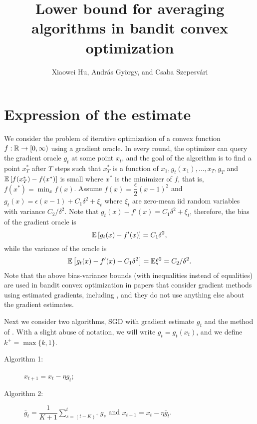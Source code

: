 \documentclass[11pt,letterpaper,english]{article}
\author{Xiaowei Hu, Andr\'as Gy\"orgy, and Csaba Szepesv\'ari}
\title{Lower bound for averaging algorithms in bandit convex optimization}
\begin{document}
\maketitle

\section{Expression of the estimate}


We consider the problem of iterative optimization of a convex function $f:\mathbb{R} \to [0,\infty)$ using a gradient oracle.
In every round, the optimizer can query the gradient oracle $g_t$ at some point $x_t$, and the goal of the algorithm is to find a point $x^*_T$ after $T$ steps such that $x^*_T$ is a function of $x_1,g_t(x_1),\ldots, x_{T},g_T$ and $\mathbb{E}\left[f(x^*_T)-f(x^*)\right]$ is small where $x^*$ is the minimizer of $f$, that is, $f(x^*)=\min_x f(x)$. Assume $f(x) = \dfrac{\epsilon}{2} (x-1)^2$ and 
$g_t(x) = \epsilon (x-1) + C_1 \delta^2 + \xi_t$ where $\xi_t$ are zero-mean iid random variables with variance $C_2 /\delta^2$.
Note that 
$g_t(x)-f'(x)=C_1 \delta^2 + \xi_t$, therefore, the bias of the gradient oracle is 
\[
\mathbb{E}\left[g_t(x)-f'(x)\right]=C_1 \delta^2,
\] 
while the variance of the oracle is
\[
\mathbb{E}\left[g_t(x)-f'(x)-C_1 \delta^2\right] = \mathbb{E}{\xi^2} = C_2 /\delta^2.
\]
Note that the above bias-variance bounds (with inequalities instead of equalities) are used in bandit convex optimization in papers that consider gradient methods using estimated gradients, including \citep{DekelEK15}, and they do not use anything else about the gradient estimates.

Next we consider two algorithms, SGD with gradient estimate $g_t$ and the method of \citet{DekelEK15}. With a slight abuse of notation, we will write $g_t=g_t(x_t)$, and we define $k^+=\max\{k,1\}$.
\begin{description}
\item[Algorithm 1:] $ x_{t+1} = x_t - \eta  g_t$;

\item[Algorithm 2:] $\bar{g}_t = \dfrac{1}{K+1}  \sum_{s=(t-K)^+}^t g_s$ and
$x_{t+1} = x_t - \eta  \bar{g}_t$.
\end{description}
\end{document}
